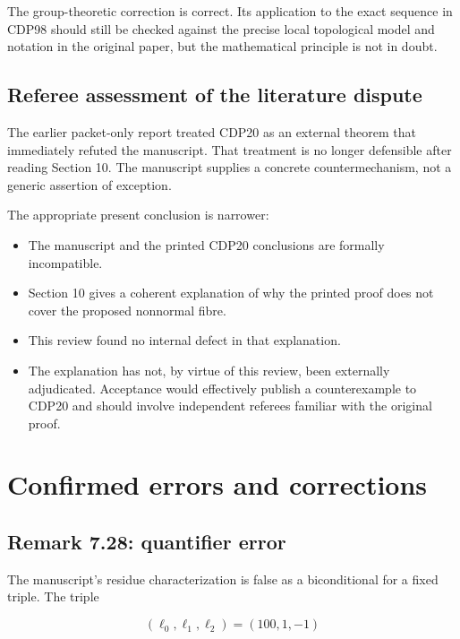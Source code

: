 \documentclass[
  10pt,
  letterpaper,
]{article}
\providecommand{\tightlist}{%
  \setlength{\itemsep}{0pt}\setlength{\parskip}{0pt}}
\begin{document}
The group-theoretic correction is correct. Its application to the exact
sequence in CDP98 should still be checked against the precise local
topological model and notation in the original paper, but the
mathematical principle is not in doubt.

\subsection{Referee assessment of the literature
dispute}\label{referee-assessment-of-the-literature-dispute}

The earlier packet-only report treated CDP20 as an external theorem that
immediately refuted the manuscript. That treatment is no longer
defensible after reading Section 10. The manuscript supplies a concrete
countermechanism, not a generic assertion of exception.

The appropriate present conclusion is narrower:

\begin{itemize}
\tightlist
\item
  The manuscript and the printed CDP20 conclusions are formally
  incompatible.
\item
  Section 10 gives a coherent explanation of why the printed proof does
  not cover the proposed nonnormal fibre.
\item
  This review found no internal defect in that explanation.
\item
  The explanation has not, by virtue of this review, been externally
  adjudicated. Acceptance would effectively publish a counterexample to
  CDP20 and should involve independent referees familiar with the
  original proof.
\end{itemize}

\section{Confirmed errors and
corrections}\label{confirmed-errors-and-corrections}

\subsection{Remark 7.28: quantifier
error}\label{remark-7.28-quantifier-error}

The manuscript's residue characterization is false as a biconditional
for a fixed triple. The triple

\[
(\ell_0,\ell_1,\ell_2)=(100,1,-1)
\]
\end{document}
